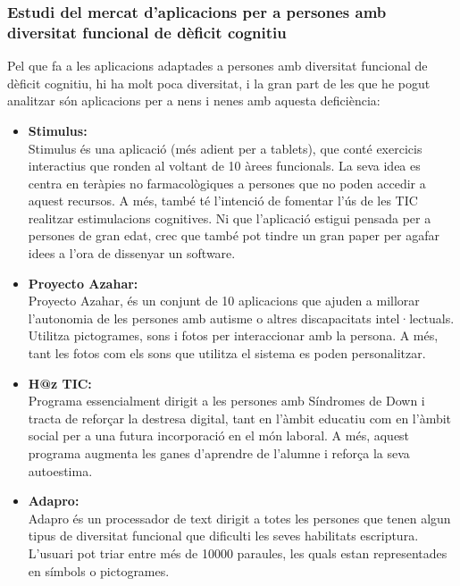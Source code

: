 \documentclass[11pt,catalan,listoffigures,listoftables]{tfgetsinf}
\begin{document}
\subsubsection{Estudi del mercat d’aplicacions per a persones amb diversitat funcional de dèficit cognitiu}

Pel que fa a les aplicacions adaptades a persones amb diversitat funcional de dèficit cognitiu, hi ha molt poca diversitat, i la gran part de les que he pogut analitzar són aplicacions per a nens i nenes amb aquesta deficiència:

\begin{itemize}
	\item \textbf{Stimulus:}\\Stimulus és una aplicació (més adient per a tablets), que conté exercicis interactius que ronden al voltant de 10 àrees funcionals. La seva idea es centra en teràpies no farmacològiques a persones que no poden accedir a aquest recursos. A més, també té l’intenció de fomentar l’ús de les TIC realitzar estimulacions cognitives. Ni que l’aplicació estigui pensada per a persones de gran edat, crec que també pot tindre un gran paper per agafar idees a l’ora de dissenyar un software.
	\item \textbf{Proyecto Azahar:}\\Proyecto Azahar, és un conjunt de 10 aplicacions que ajuden a millorar l’autonomia de les persones amb autisme o altres discapacitats intel·lectuals. Utilitza pictogrames, sons i fotos per interaccionar amb la persona. A més, tant les fotos com els sons que utilitza el sistema es poden personalitzar.
	\item \textbf{H@z TIC:}\\Programa essencialment dirigit a les persones amb Síndromes de Down i tracta de reforçar la destresa digital, tant en l’àmbit educatiu com en l’àmbit social per a una futura incorporació en el món laboral. A més, aquest programa augmenta les ganes d’aprendre de l’alumne i reforça la seva autoestima.
	\item \textbf{Adapro:}\\Adapro és un processador de text dirigit a totes les persones que tenen algun tipus de diversitat funcional que dificulti les seves habilitats escriptura. L’usuari pot triar entre més de 10000 paraules, les quals estan representades en símbols o pictogrames.
\end{itemize}
\end{document}
